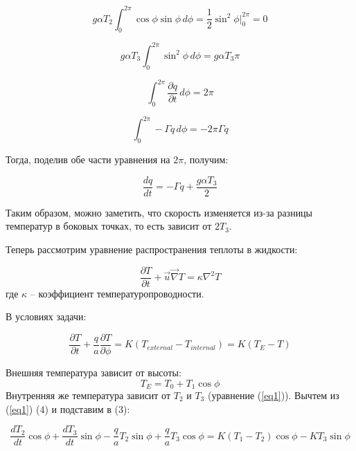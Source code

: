 \documentclass[12pt]{article}
\begin{document}
\begin{equation*}
g \alpha T_2 \int_{0}^{2\pi} \cos\phi \sin\phi\, d\phi = \frac{1}{2} \sin^2 \phi \Big|_0^{2\pi} = 0
\end{equation*}

\begin{equation*}
g \alpha T_3 \int_{0}^{2\pi} \sin^2 \phi\, d\phi = g \alpha T_3 \pi
\end{equation*}

\begin{equation*}
\int_{0}^{2\pi} \frac{\partial q}{\partial t}\, d\phi = 2\pi
\end{equation*}

\begin{equation*}
\int_{0}^{2\pi} -\Gamma q\, d\phi = -2\pi\Gamma q
\end{equation*}

Тогда, поделив обе части уравнения на $2\pi$, получим:

\begin{equation}\label{eq23}
\frac{dq}{dt} = -\Gamma q + \frac{g \alpha T_3}{2}
\end{equation}

Таким образом, можно заметить, что скорость изменяется из-за разницы температур в боковых точках, то есть зависит от $2T_3$.

Теперь рассмотрим уравнение распространения теплоты в жидкости:

\begin{equation*}
\frac{\partial T}{\partial t} + \overrightarrow{u} \overrightarrow{\nabla} T = \kappa \nabla^2 T 
\end{equation*}
где $\kappa$ -- коэффициент температуропроводности.

В условиях задачи:

\begin{equation}\label{eq3}
\frac{\partial T}{\partial t} + \frac{q}{a} \frac{\partial T}{\partial \phi} = K(T_{external}-T_{internal}) = K(T_E-T)
\end{equation}

Внешняя температура зависит от высоты: 
\begin{equation}\label{eq4}
T_E = T_0+T_1\cos\phi
\end{equation}
Внутренняя же температура зависит от $T_2$ и $T_3$ (уравнение (\ref{eq1})). Вычтем из (\ref{eq1}) (4) и подставим в (3):

\begin{equation*}
\frac{dT_2}{dt}\cos\phi + \frac{dT_3}{dt}\sin\phi - \frac{q}{a}T_2\sin\phi + \frac{q}{a}T_3\cos\phi = K(T_1-T_2)\cos\phi-KT_3\sin\phi
\end{equation*}
\end{document}
